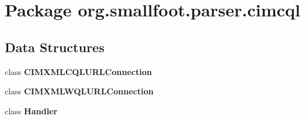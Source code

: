 \section{Package org.\+smallfoot.\+parser.\+cimcql}
\label{namespaceorg_1_1smallfoot_1_1parser_1_1cimcql}
\subsection*{Data Structures}
\begin{DoxyCompactItemize}
\item 
class {\bf C\+I\+M\+X\+M\+L\+C\+Q\+L\+U\+R\+L\+Connection}
\item 
class {\bf C\+I\+M\+X\+M\+L\+W\+Q\+L\+U\+R\+L\+Connection}
\item 
class {\bf Handler}
\end{DoxyCompactItemize}
